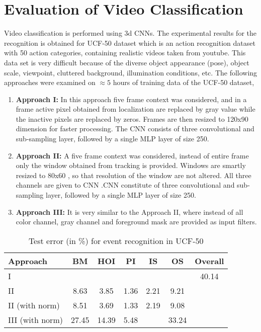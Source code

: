 \section{Evaluation of Video Classification} 
\label{sec:EvVS}
Video classification is performed using 3d CNNs. The experimental results for the recognition is obtained for UCF-50 dataset which is an action recognition dataset with 50 action categories, containing realistic videos taken from youtube. This data set is very difficult because of the diverse object appearance (pose), object scale, viewpoint, cluttered background, illumination conditions, etc. The following approaches were examined on $\approx{5}$ hours of training data of the UCF-50 dataset,
\begin{enumerate}
	\item{\textbf{Approach I:} In this approach five frame context was considered, and in a frame active pixel obtained from localization are replaced by gray value while the inactive pixels are replaced by zeros. Frames are then resized to 120x90 dimension for faster processing. The CNN consists of three convolutional and sub-sampling layer,  followed by a single MLP layer of size 250.}
	\item{\textbf{Approach II:} A five frame context was considered, instead of entire frame only the window obtained from tracking is provided.  Windows are smartly resized to 80x60 , so that resolution of the window are not altered. All three channels are given to CNN .CNN constitute of three convolutional and sub-sampling layer,  followed by a single MLP layer of size 250.}
	\item{\textbf{Approach III:} It is very similar to the Approach II, where instead of all color channel, gray channel and foreground mask are provided as input filters.}	
\end{enumerate}
\begin{table}[htbp]
   \caption{Test error (in \%) for event recognition in UCF-50}
   \begin{center}
   \begin{tabular}{|l|c|c|c|c|c|c|} \hline
        \textbf{Approach} & \textbf{BM} & \textbf{HOI} & \textbf{PI} & \textbf{IS} & \textbf{OS} & Overall \\ \hline
        I & & & & & & 40.14\\ \hline
		II & 8.63 & 3.85 & 1.36 & 2.21 & 9.21 & \\ \hline
		II (with norm) & 8.51 & 3.69 & 1.33 & 2.19 & 9.08 & \\ \hline		 
		III (with norm) & 27.45 & 14.39 & 5.48 & & 33.24 & \\ \hline
   \end{tabular}
   \label{tab:recognition}
   \medskip \small 
   \end{center}
 \end{table} 
